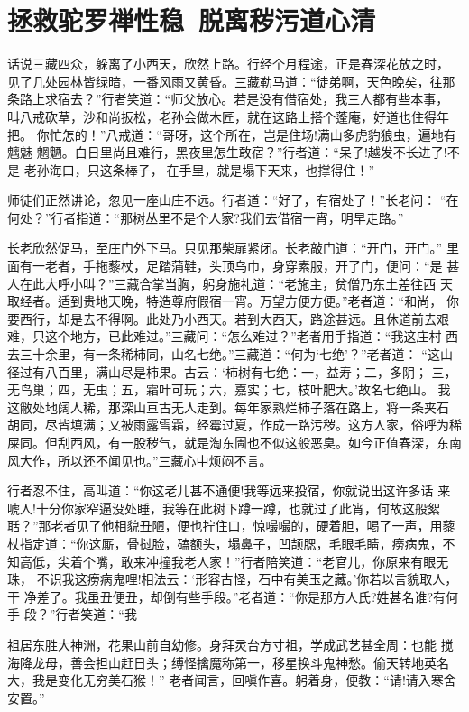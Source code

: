 \chapter{拯救驼罗禅性稳~脱离秽污道心清}

话说三藏四众，躲离了小西天，欣然上路。行经个月程途，正是春深花放之时，
见了几处园林皆绿暗，一番风雨又黄昏。三藏勒马道：“徒弟啊，天色晚矣，往那
条路上求宿去？”行者笑道：“师父放心。若是没有借宿处，我三人都有些本事，
叫八戒砍草，沙和尚扳松，老孙会做木匠，就在这路上搭个蓬庵，好道也住得年把。
你忙怎的！”八戒道：“哥呀，这个所在，岂是住场!满山多虎豹狼虫，遍地有魑魅
魍魉。白日里尚且难行，黑夜里怎生敢宿？”行者道：“呆子!越发不长进了!不是
老孙海口，只这条棒子，在手里，就是塌下天来，也撑得住！”

师徒们正然讲论，忽见一座山庄不远。行者道：“好了，有宿处了！”长老问：
“在何处？”行者指道：“那树丛里不是个人家?我们去借宿一宵，明早走路。”

长老欣然促马，至庄门外下马。只见那柴扉紧闭。长老敲门道：“开门，开门。”
里面有一老者，手拖藜杖，足踏蒲鞋，头顶乌巾，身穿素服，开了门，便问：“是
甚人在此大呼小叫？”三藏合掌当胸，躬身施礼道：“老施主，贫僧乃东土差往西
天取经者。适到贵地天晚，特造尊府假宿一宵。万望方便方便。”老者道：“和尚，
你要西行，却是去不得啊。此处乃小西天。若到大西天，路途甚远。且休道前去艰
难，只这个地方，已此难过。”三藏问：“怎么难过？”老者用手指道：“我这庄村
西去三十余里，有一条稀柿同，山名七绝。”三藏道：“何为‘七绝’？”老者道：
“这山径过有八百里，满山尽是柿果。古云：‘柿树有七绝：一，益寿；二，多阴；
三，无鸟巢；四，无虫；五，霜叶可玩；六，嘉实；七，枝叶肥大。’故名七绝山。
我这敝处地阔人稀，那深山亘古无人走到。每年家熟烂柿子落在路上，将一条夹石
胡同，尽皆填满；又被雨露雪霜，经霉过夏，作成一路污秽。这方人家，俗呼为稀
屎同。但刮西风，有一股秽气，就是淘东圊也不似这般恶臭。如今正值春深，东南
风大作，所以还不闻见也。”三藏心中烦闷不言。

行者忍不住，高叫道：“你这老儿甚不通便!我等远来投宿，你就说出这许多话
来唬人!十分你家窄逼没处睡，我等在此树下蹲一蹲，也就过了此宵，何故这般絮
聒？”那老者见了他相貌丑陋，便也拧住口，惊嘬嘬的，硬着胆，喝了一声，用藜
杖指定道：“你这厮，骨挝脸，磕额头，塌鼻子，凹颉腮，毛眼毛睛，痨病鬼，不
知高低，尖着个嘴，敢来冲撞我老人家！”行者陪笑道：“老官儿，你原来有眼无珠，
不识我这痨病鬼哩!相法云：‘形容古怪，石中有美玉之藏。’你若以言貌取人，干
净差了。我虽丑便丑，却倒有些手段。”老者道：“你是那方人氏?姓甚名谁?有何手
段？”行者笑道：“我

祖居东胜大神洲，花果山前自幼修。身拜灵台方寸祖，学成武艺甚全周：也能
搅海降龙母，善会担山赶日头；缚怪擒魔称第一，移星换斗鬼神愁。偷天转地英名
大，我是变化无穷美石猴！”
老者闻言，回嗔作喜。躬着身，便教：“请!请入寒舍安置。”

